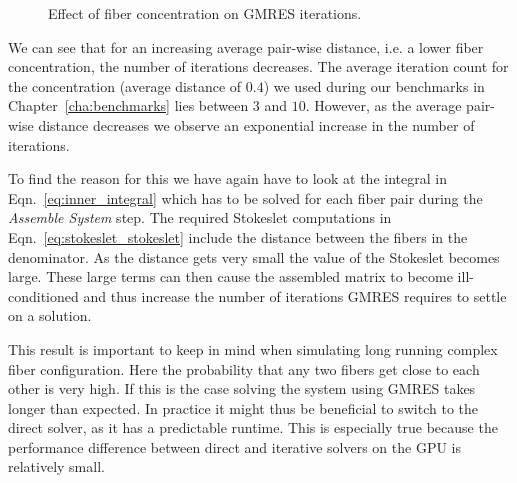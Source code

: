 \begin{figure}[!htbp]
  \centering
  \caption{Effect of fiber concentration on GMRES iterations.}
  \label{fig:concentration_gmres}
\end{figure}

We can see that for an increasing average pair-wise distance, i.e. a lower fiber concentration, the number of iterations decreases. The average iteration count for the concentration (average distance of $0.4$) we used during our benchmarks in Chapter~\ref{cha:benchmarks} lies between $3$ and $10$. However, as the average pair-wise distance decreases we observe an exponential increase in the number of iterations.

To find the reason for this we have again have to look at the integral in Eqn.~\eqref{eq:inner_integral} which has to be solved for each fiber pair during the \emph{Assemble System} step. The required Stokeslet computations in Eqn.~\eqref{eq:stokeslet_stokeslet} include the distance between the fibers in the denominator. As the distance gets very small the value of the Stokeslet becomes large. These large terms can then cause the assembled matrix to become ill-conditioned and thus increase the number of iterations GMRES requires to settle on a solution.

This result is important to keep in mind when simulating long running complex fiber configuration. Here the probability that any two fibers get close to each other is very high. If this is the case solving the system using GMRES takes longer than expected. In practice it might thus be beneficial to switch to the direct solver, as it has a predictable runtime. This is especially true because the performance difference between direct and iterative solvers on the GPU is relatively small.

